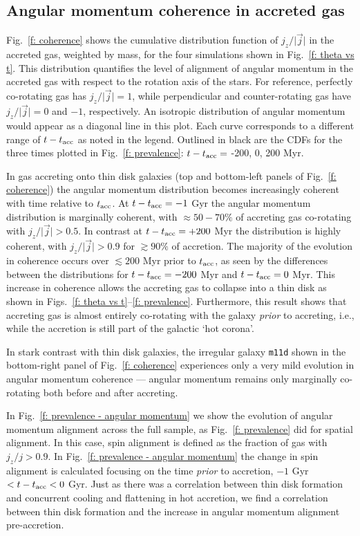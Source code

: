 \documentclass[fleqn,usenatbib]{mnras}
\newcommand{\tacc}{t_{\rm acc}}
\begin{document}
\subsection{Angular momentum coherence in accreted gas}
\label{s: mechanics -- coherence}

Fig.~\ref{f: coherence} shows the cumulative distribution function of $j_z / \vert \vec j \vert$ in the accreted gas, weighted by mass, for the four simulations shown in Fig.~\ref{f: theta vs t}.
This distribution quantifies the level of alignment of angular momentum in the accreted gas with respect to the rotation axis of the stars.
For reference, perfectly co-rotating gas has $j_z / \vert \vec j \vert = 1$, while perpendicular and counter-rotating gas have $j_z / \vert \vec j \vert = 0$ and $-1$, respectively.
An isotropic distribution of angular momentum would appear as a diagonal line in this plot. 
Each curve corresponds to a different range of $t - \tacc$ as noted in the legend. 
Outlined in black are the CDFs for the three times plotted in Fig.~\ref{f: prevalence}: $t - \tacc =$ -200, 0, 200 Myr.

In gas accreting onto thin disk galaxies (top and bottom-left panels of Fig.~\ref{f: coherence}) the angular momentum distribution becomes increasingly coherent with time relative to $\tacc$.
At $t-\tacc=-1$ Gyr the angular momentum distribution is marginally coherent, with $\approx50-70\%$ of accreting gas co-rotating with $j_z/\vert \vec j \vert > 0.5$.
In contrast at $t-\tacc=+200$ Myr the distribution is highly coherent, with $j_z/\vert \vec j \vert > 0.9$ for $\gtrsim 90\%$ of accretion.
The majority of the evolution in coherence occurs over $\lesssim 200$ Myr prior to $\tacc$, as seen by the differences between the distributions for $t-\tacc=-200$ Myr and $t-\tacc=0$ Myr.
This increase in coherence allows the accreting gas to collapse into a thin disk as shown in Figs.~\ref{f: theta vs t}--\ref{f: prevalence}.
Furthermore, this result shows that accreting gas is almost entirely co-rotating with the galaxy {\em prior} to accreting, i.e., while the accretion is still part of the galactic `hot corona'. 

In stark contrast with thin disk galaxies, the irregular galaxy \texttt{m11d} shown in the bottom-right panel of Fig.~\ref{f: coherence} experiences only a very mild evolution in angular momentum coherence --- angular momentum remains only marginally co-rotating both before and after accreting.

In Fig.~\ref{f: prevalence - angular momentum} we show the evolution of angular momentum alignment across the full sample, as Fig.~\ref{f: prevalence} did for spatial alignment. 
In this case, spin alignment is defined as the fraction of gas with $j_z/j > 0.9$.
In Fig.~\ref{f: prevalence - angular momentum} the change in spin alignment is calculated focusing on the time \textit{prior} to accretion, $-1$ Gyr $< t - \tacc < 0$ Gyr.
Just as there was a correlation between thin disk formation and concurrent cooling and flattening in hot accretion, we find a correlation between thin disk formation and the increase in angular momentum alignment pre-accretion.
\end{document}
